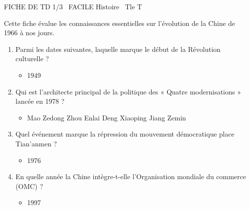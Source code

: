 \documentclass[11pt]{article}
\begin{document}
\begin{tcolorbox}[enhanced,colback=popink,colframe=popink,arc=10pt,boxrule=0pt,left=12pt,right=12pt,top=9pt,bottom=9pt]
{\color{white}\popxbold\small FICHE DE TD 1/3 \textbullet\ FACILE \hfill Histoire \textbullet\ Tle T\par}
\end{tcolorbox}
\vspace{4pt}
Cette fiche évalue les connaissances essentielles sur l'évolution de la Chine de 1966 à nos jours.

\begin{exercice}
\begin{enumerate}
    \item Parmi les dates suivantes, laquelle marque le début de la Révolution culturelle ?
    \begin{itemize}
        \item[A.] 1949   
    \end{itemize}
    \item Qui est l'architecte principal de la politique des « Quatre modernisations » lancée en 1978 ?
    \begin{itemize}
        \item[A.] Mao Zedong \quad [B.] Zhou Enlai \quad [C.] Deng Xiaoping \quad [D.] Jiang Zemin
    \end{itemize}
    \item Quel événement marque la répression du mouvement démocratique place Tian'anmen ?
    \begin{itemize}
        \item[A.] 1976   
    \end{itemize}
    \item En quelle année la Chine intègre-t-elle l'Organisation mondiale du commerce (OMC) ?
    \begin{itemize}
        \item[A.] 1997   
    \end{itemize}
\end{enumerate}
\end{exercice}
\end{document}
